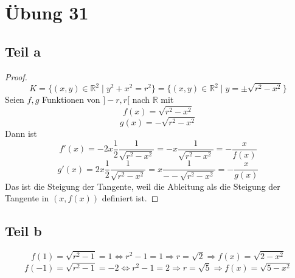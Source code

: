 \documentclass[10pt,a4paper]{article}
\begin{document}
\section*{Übung 31}

\subsection*{Teil a}

\begin{proof}
\begin{equation}
K = \{ (x, y) \in \mathbb{R}^{2} \mid y^{2} + x^{2} = r^{2} \} = \{ (x, y) \in \mathbb{R}^{2} \mid y = \pm \sqrt{r^{2} - x^{2}} \}
\end{equation}
Seien $f, g$ Funktionen von $]-r, r[$ nach $\mathbb{R}$ mit
\begin{equation}
f(x) = \sqrt{r^{2} - x^{2}}
\end{equation}
\begin{equation}
g(x) = -\sqrt{r^{2} - x^{2}}
\end{equation}
Dann ist
\begin{equation}
f'(x) = -2x \frac{1}{2} \frac{1}{\sqrt{r^{2} - x^{2}}} = -x\frac{1}{\sqrt{r^{2} - x^{2}}} = -\frac{x}{f(x)}
\end{equation}
\begin{equation}
g'(x) = 2x \frac{1}{2} \frac{1}{\sqrt{r^{2} - x^{2}}} = x\frac{1}{--\sqrt{r^{2} - x^{2}}} = -\frac{x}{g(x)}
\end{equation}
Das ist die Steigung der Tangente, weil die Ableitung als die Steigung der Tangente in $(x, f(x))$ definiert ist.
\end{proof}

\subsection*{Teil b}

\begin{equation}
f(1) = \sqrt{r^{2} - 1} = 1 \Leftrightarrow r^{2} - 1 = 1 \Rightarrow r = \sqrt{2} \Rightarrow f(x) = \sqrt{2 - x^{2}}
\end{equation}
\begin{equation}
f(-1) = \sqrt{r^{2} - 1} = -2 \Leftrightarrow r^{2} - 1 = 2 \Rightarrow r = \sqrt{5} \Rightarrow f(x) = \sqrt{5 - x^{2}}
\end{equation}
\end{document}
